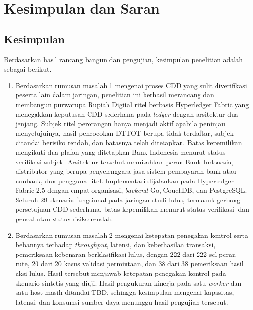 \chapter{Kesimpulan dan Saran}

\section{Kesimpulan}

Berdasarkan hasil rancang bangun dan pengujian, kesimpulan penelitian adalah
sebagai berikut.
\begin{enumerate}
    \item Berdasarkan rumusan masalah 1 mengenai proses CDD yang sulit diverifikasi peserta lain dalam jaringan, penelitian ini berhasil merancang dan membangun purwarupa Rupiah Digital ritel berbasis Hyperledger Fabric yang menegakkan keputusan CDD sederhana pada \textit{ledger} dengan arsitektur dua jenjang. Subjek ritel perorangan hanya menjadi aktif apabila peninjau menyetujuinya, hasil pencocokan DTTOT berupa tidak terdaftar, subjek ditandai berisiko rendah, dan batasnya telah ditetapkan. Batas kepemilikan mengikuti dua plafon yang ditetapkan Bank Indonesia menurut status verifikasi subjek. Arsitektur tersebut memisahkan peran Bank Indonesia, distributor yang berupa penyelenggara jasa sistem pembayaran bank atau nonbank, dan pengguna ritel. Implementasi dijalankan pada Hyperledger Fabric 2.5 dengan empat organisasi, \textit{backend} Go, CouchDB, dan PostgreSQL. Seluruh 29 skenario fungsional pada jaringan studi lulus, termasuk gerbang persetujuan CDD sederhana, batas kepemilikan menurut status verifikasi, dan pencabutan status risiko rendah.
    \item Berdasarkan rumusan masalah 2 mengenai ketepatan penegakan kontrol serta bebannya terhadap \textit{throughput}, latensi, dan keberhasilan transaksi, pemeriksaan kebenaran berklasifikasi lulus, dengan 222 dari 222 sel peran-rute, 20 dari 20 kasus validasi permintaan, dan 38 dari 38 pemeriksaan hasil aksi lulus. Hasil tersebut menjawab ketepatan penegakan kontrol pada skenario sintetis yang diuji. Hasil pengukuran kinerja pada satu \textit{worker} dan satu host masih ditandai TBD, sehingga kesimpulan mengenai kapasitas, latensi, dan konsumsi sumber daya menunggu hasil pengujian tersebut.
\end{enumerate}

